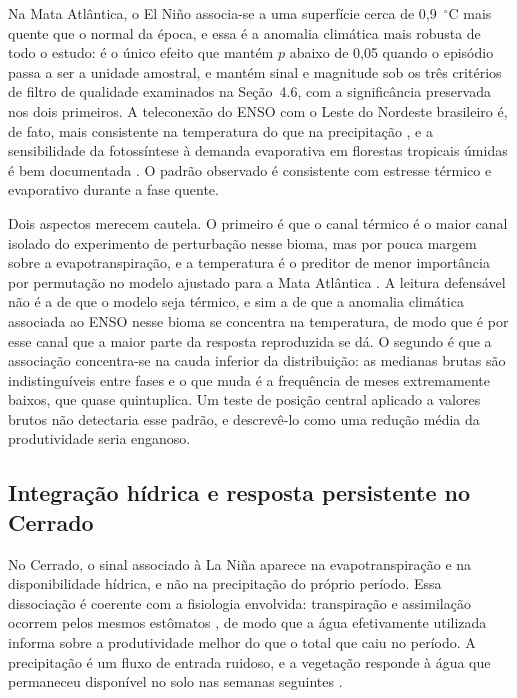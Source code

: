\documentclass[a4paper,fleqn]{cas-sc}
\begin{document}
Na Mata Atlântica, o El Niño associa-se a uma superfície cerca de 0,9~$^{\circ}$C mais quente que o normal da época, e essa é a anomalia climática mais robusta de todo o estudo: é o único efeito que mantém $p$ abaixo de 0,05 quando o episódio passa a ser a unidade amostral, e mantém sinal e magnitude sob os três critérios de filtro de qualidade examinados na Seção~4.6, com a significância preservada nos dois primeiros. A teleconexão do ENSO com o Leste do Nordeste brasileiro é, de fato, mais consistente na temperatura do que na precipitação \citep{ropelewski1987, kayano2007}, e a sensibilidade da fotossíntese à demanda evaporativa em florestas tropicais úmidas é bem documentada \citep{lawson2019, vourlitis2022}. O padrão observado é consistente com estresse térmico e evaporativo durante a fase quente.

Dois aspectos merecem cautela. O primeiro é que o canal térmico é o maior canal isolado do experimento de perturbação nesse bioma, mas por pouca margem sobre a evapotranspiração, e a temperatura é o preditor de menor importância por permutação no modelo ajustado para a Mata Atlântica \citep{oliveira2026}. A leitura defensável não é a de que o modelo seja térmico, e sim a de que a anomalia climática associada ao ENSO nesse bioma se concentra na temperatura, de modo que é por esse canal que a maior parte da resposta reproduzida se dá. O segundo é que a associação concentra-se na cauda inferior da distribuição: as medianas brutas são indistinguíveis entre fases e o que muda é a frequência de meses extremamente baixos, que quase quintuplica. Um teste de posição central aplicado a valores brutos não detectaria esse padrão, e descrevê-lo como uma redução média da produtividade seria enganoso.

\subsection{Integração hídrica e resposta persistente no Cerrado}

No Cerrado, o sinal associado à La Niña aparece na evapotranspiração e na disponibilidade hídrica, e não na precipitação do próprio período. Essa dissociação é coerente com a fisiologia envolvida: transpiração e assimilação ocorrem pelos mesmos estômatos \citep{lawson2019}, de modo que a água efetivamente utilizada informa sobre a produtividade melhor do que o total que caiu no período. A precipitação é um fluxo de entrada ruidoso, e a vegetação responde à água que permaneceu disponível no solo nas semanas seguintes \citep{oliveira2005, schwinning2004}.
\end{document}
